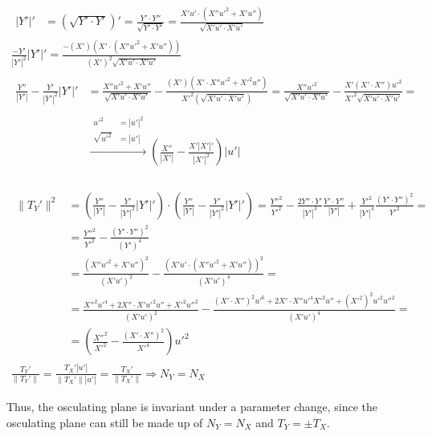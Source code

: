 \documentclass[twoside]{amsart}
\theoremstyle{plain}
\theoremstyle{definition}
\begin{document}
\begin{enumerate}
\[\begin{gathered}
\begin{aligned}
    |Y'|' & = (\sqrt{ Y'\cdot Y'})' = \frac{Y' \cdot Y''}{ \sqrt{ Y'\cdot Y' } } = \frac{X'u'\cdot (X''u'^2 + X'u'') }{ \sqrt{ X'u' \cdot X'u' } }
  \end{aligned} \\
  \frac{-Y'}{|Y'|^2} |Y'|' = \frac{- (X')(X'\cdot (X''u'^2 + X'u'') )}{ (X')^2 \sqrt{ X'u'\cdot X'u' } } \\
  \begin{aligned}
    \frac{Y''}{ |Y'|} - \frac{Y'}{|Y'|^2} |Y'|' & = \frac{X'' u'^2 + X'u''}{ \sqrt{ X'u' \cdot X' u' } } - \frac{ (X')(X'\cdot X'' u'^2 + X'^2 u'' ) }{ X'^2 (\sqrt{ X'u' \cdot X'u' } ) } = \frac{ X'' u'^2 }{ \sqrt{ X'u' \cdot X'u' } } - \frac{X' (X'\cdot X'')u'^2 }{ X'^2 \sqrt{ X'u' \cdot X'u' } } =  \\
    \quad \\
    & \xrightarrow{ \begin{aligned}
	u'^2 & = |u'|^2 \\
	\sqrt{u'^2} & = |u'| 
      \end{aligned} } \left( \frac{X''}{|X'|} - \frac{X' |X'|'}{|X'|^2 } \right)|u'|
  \end{aligned}
\end{gathered}
\] 
\quad \\
\[
\begin{gathered}
  \begin{aligned}
    \| T_Y' \|^2 & = \left( \frac{Y''}{|Y'|} - \frac{Y'}{|Y'|^2} |Y'|' \right) \cdot \left( \frac{Y''}{|Y'|} - \frac{Y'}{|Y'|^2} |Y'|' \right) = \frac{Y''^2}{Y'^2} - \frac{2 Y''\cdot Y' }{ |Y'|^3} \frac{Y'\cdot Y'' }{ |Y'| } + \frac{Y'^2}{ |Y'|^4} \frac{ (Y'\cdot Y'' )^2}{ Y'^2 } = \\
    & = \frac{Y''^2}{Y'^2 } - \frac{(Y'\cdot Y'')^2}{ (Y')^4 } \\
    & = \frac{(X'' u'^2 + X'u'')^2 }{ (X'u')^2 } - \frac{ (X'u' \cdot (X''u'^2 + X'u'') )^2 }{ (X'u')^4} = \\
    & = \frac{ X''^2 u'^4 + 2X''\cdot X' u'^2 u'' + X'^2 u''^2 }{ (X'u')^2 } - \frac{ (X'\cdot X'')^2 u'^6 + 2X'\cdot X'' u'^4 X'^2 u'' + (X'^2)^2 u'^2 u''^2 }{ (X'u')^4 } = \\
    & = \left( \frac{X''^2}{X'^2} - \frac{ (X'\cdot X'')^2}{ X'^4} \right) u'^2 
  \end{aligned}  \\
  \frac{T_Y'}{ \| T_Y' \| } = \frac{T_X' |u'| }{ \| T_X' \| |u'|} = \frac{T_X'}{\| T_X' \| } \Longrightarrow \boxed{ N_Y = N_X }
\end{gathered}
\]

Thus, the osculating plane is invariant under a parameter change, since the osculating plane can still be made up of $N_Y=N_X$ and $T_Y = \pm T_X$.  
\end{enumerate}
\end{document}

